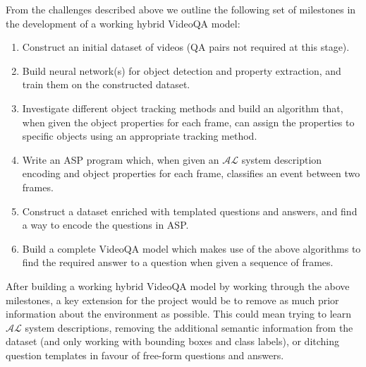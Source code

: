 \documentclass[../interim.tex]{subfiles}
\begin{document}
From the challenges described above we outline the following set of milestones in the development of a working hybrid VideoQA model:
\begin{enumerate}
  \item Construct an initial dataset of videos (QA pairs not required at this stage).

  \item Build neural network(s) for object detection and property extraction, and train them on the constructed dataset.

  \item Investigate different object tracking methods and build an algorithm that, when given the object properties for each frame, can assign the properties to specific objects using an appropriate tracking method.

  \item Write an ASP program which, when given an $\mathcal{AL}$ system description encoding and object properties for each frame, classifies an event between two frames.

  \item Construct a dataset enriched with templated questions and answers, and find a way to encode the questions in ASP.

  \item Build a complete VideoQA model which makes use of the above algorithms to find the required answer to a question when given a sequence of frames.
\end{enumerate}

After building a working hybrid VideoQA model by working through the above milestones, a key extension for the project would be to remove as much prior information about the environment as possible. This could mean trying to learn $\mathcal{AL}$ system descriptions, removing the additional semantic information from the dataset (and only working with bounding boxes and class labels), or ditching question templates in favour of free-form questions and answers.
\end{document}
